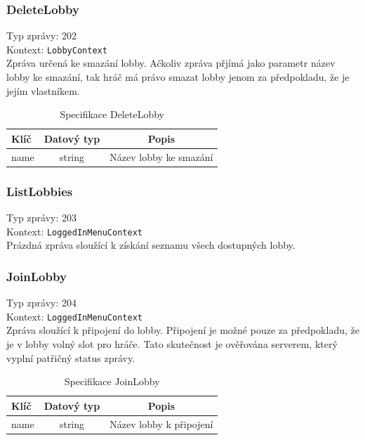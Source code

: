 \documentclass[12pt, a4paper]{article}
\begin{document}
    \subsubsection*{DeleteLobby}
    Typ zprávy: 202\\
    Kontext: \texttt{LobbyContext}\\

    Zpráva určená ke smazání lobby.
    Ačkoliv zpráva přjímá jako parametr název lobby ke smazání, tak hráč má právo smazat lobby jenom za předpokladu, že je jejím vlastníkem.

    \begin{table}[H]
        \centering
        \begin{tabular}{|l|c|c|}
            \hline
            Klíč & Datový typ & Popis\\
            \hline
            \hline
            name & string & Název lobby ke smazání\\
            \hline
        \end{tabular}
        \caption{Specifikace DeleteLobby}
    \end{table}

    \subsubsection*{ListLobbies}
    Typ zprávy: 203\\
    Kontext: \texttt{LoggedInMenuContext}\\

    Prázdná zpráva sloužící k získání seznamu všech dostupných lobby.

    \subsubsection*{JoinLobby}
    Typ zprávy: 204\\
    Kontext: \texttt{LoggedInMenuContext}\\

    Zpráva sloužící k připojení do lobby.
    Připojení je možné pouze za předpokladu, že je v lobby volný slot pro hráče.
    Tato skutečnost je ověřována serverem, který vyplní patřičný status zprávy.

    \begin{table}[H]
        \centering
        \begin{tabular}{|l|c|c|}
            \hline
            Klíč & Datový typ & Popis\\
            \hline
            \hline
            name & string & Název lobby k připojení\\
            \hline
        \end{tabular}
        \caption{Specifikace JoinLobby}
    \end{table} 
\end{document}
